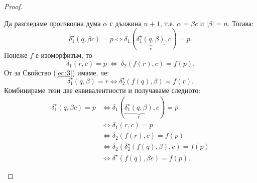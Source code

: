 \begin{proof}
\begin{itemize}
{      
    }
    Да разгледаме произволна дума $\alpha$ с дължина $n+1$, т.е. $\alpha = \beta c$ и $|\beta| = n$. Тогава:
    \[\delta^\star_1(q,\beta c) = p \iff \delta_1(\underbrace{\delta^\star_1(q,\beta)}_{r}, c) = p.\]
    Понеже $f$ е изоморфизъм, то
    \[\delta_1(r,c) = p\ \iff\ \delta_2(f(r),c) = f(p).\]
    От \IndHyp за Свойство (\ref{eq:3}) имаме, че:
    \[\delta^\star_1(q,\beta) = r \iff \delta^\star_2(f(q),\beta) = f(r).\]
    Комбинираме тези две еквивалентности и получаваме следното:
    \begin{align*}
      \delta^\star_1(q,\beta c) = p & \iff \delta_1(\underbrace{\delta^\star_1(q,\beta)}_{r}, c) = p\\
                                    & \iff \delta_1(r,c) = p\\
                                    & \iff \delta_2(f(r),c) = f(p)\\
                                    & \iff \delta_2(\delta^\star_2(f(q),\beta),c) = f(p)\\
                                    & \iff \delta^\star(f(q),\beta c) = f(p).
    \end{align*}
    

    
  \end{itemize}
\end{proof}

